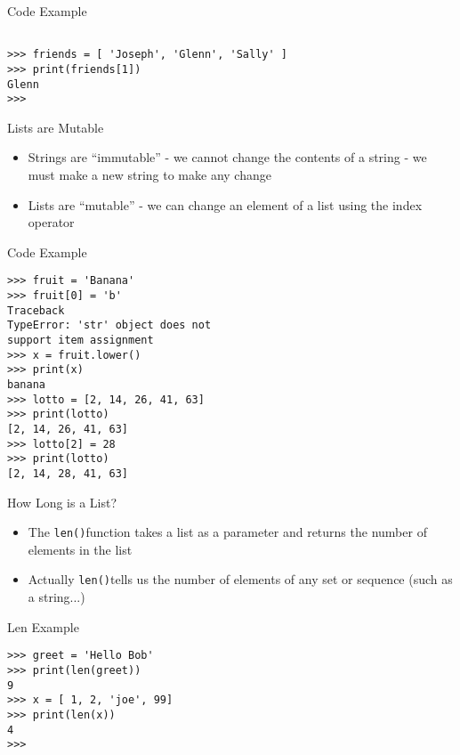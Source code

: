 \documentclass[serif, aspectratio=169]{beamer}
\begin{document}
\begin{frame}[fragile]{Code Example}
    \begin{lstlisting}

>>> friends = [ 'Joseph', 'Glenn', 'Sally' ]
>>> print(friends[1])
Glenn
>>> 
    \end{lstlisting}
\end{frame}

\begin{frame}{Lists are Mutable}
    \begin{itemize}
        \item Strings are “immutable” - we cannot change the contents of a string - we must make a new string to make any change
        \item Lists are “mutable” - we can change an element of a list using the index operator


    \end{itemize}
\end{frame}

\begin{frame}[fragile]{Code Example}
    \begin{lstlisting}
>>> fruit = 'Banana'
>>> fruit[0] = 'b'
Traceback 
TypeError: 'str' object does not 
support item assignment
>>> x = fruit.lower()
>>> print(x)
banana
>>> lotto = [2, 14, 26, 41, 63]
>>> print(lotto)
[2, 14, 26, 41, 63]
>>> lotto[2] = 28
>>> print(lotto)
[2, 14, 28, 41, 63]

    \end{lstlisting}
\end{frame}

\begin{frame}{How Long is a List?}
    \begin{itemize}
        \item The \texttt{\color{red}len()}function takes a list as a parameter and returns the number of elements in the list
        \item Actually \texttt{\color{red}len()}tells us the number of elements of any set or sequence (such as a string...)
    \end{itemize}
\end{frame}

\begin{frame}[fragile]{Len Example}
    \begin{lstlisting}
>>> greet = 'Hello Bob'
>>> print(len(greet))
9
>>> x = [ 1, 2, 'joe', 99]
>>> print(len(x))
4
>>> 
    \end{lstlisting}
\end{frame}
\end{document}
